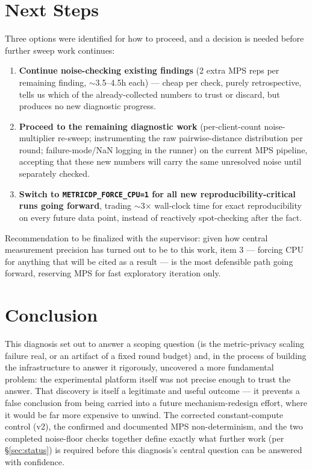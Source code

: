 \documentclass[11pt]{article}
\newcommand{\code}[1]{\texttt{#1}}
\begin{document}
\section{Next Steps}

Three options were identified for how to proceed, and a decision is needed before further sweep
work continues:

\begin{enumerate}[leftmargin=1.4em]
    \item \textbf{Continue noise-checking existing findings} (2 extra MPS reps per remaining
    finding, $\sim$3.5--4.5h each) --- cheap per check, purely retrospective, tells us which of the
    already-collected numbers to trust or discard, but produces no new diagnostic progress.
    \item \textbf{Proceed to the remaining diagnostic work} (per-client-count noise-multiplier
    re-sweep; instrumenting the raw pairwise-distance distribution per round; failure-mode/NaN
    logging in the runner) on the current MPS pipeline, accepting that these new numbers will carry
    the same unresolved noise until separately checked.
    \item \textbf{Switch to \code{METRICDP\_FORCE\_CPU=1} for all new reproducibility-critical
    runs going forward}, trading $\sim$3$\times$ wall-clock time for exact reproducibility on every
    future data point, instead of reactively spot-checking after the fact.
\end{enumerate}

Recommendation to be finalized with the supervisor: given how central measurement precision has
turned out to be to this work, item 3 --- forcing CPU for anything that will be cited as a result
--- is the most defensible path going forward, reserving MPS for fast exploratory iteration only.

\section{Conclusion}

This diagnosis set out to answer a scoping question (is the metric-privacy scaling failure real, or
an artifact of a fixed round budget) and, in the process of building the infrastructure to answer it
rigorously, uncovered a more fundamental problem: the experimental platform itself was not precise
enough to trust the answer. That discovery is itself a legitimate and useful outcome --- it prevents
a false conclusion from being carried into a future mechanism-redesign effort, where it would be far
more expensive to unwind. The corrected constant-compute control (v2), the confirmed and documented
MPS non-determinism, and the two completed noise-floor checks together define exactly what further
work (per \S\ref{sec:status}) is required before this diagnosis's central question can be answered
with confidence.
\end{document}
